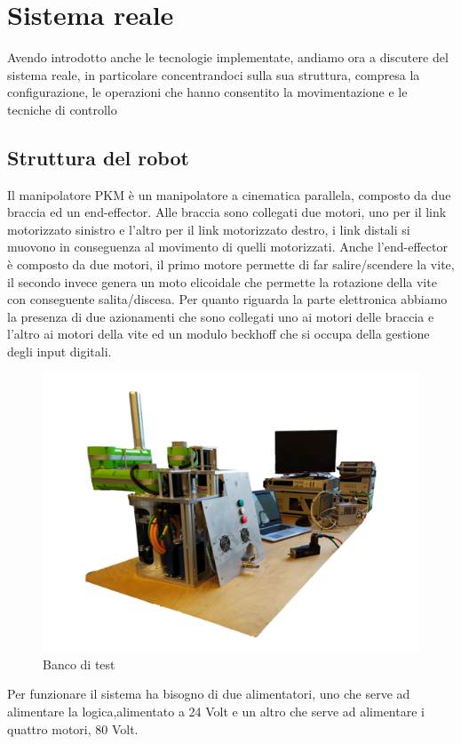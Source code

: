 

\section{Sistema reale}
Avendo introdotto anche le tecnologie implementate, andiamo ora a discutere del sistema reale, in particolare concentrandoci sulla sua struttura, compresa la configurazione, le operazioni che hanno consentito la movimentazione e le tecniche di controllo
\subsection{Struttura del robot}
Il manipolatore PKM è un manipolatore a cinematica parallela, composto da due braccia ed un end-effector. Alle braccia sono collegati due motori, uno per il link motorizzato sinistro e l'altro per il link motorizzato destro, i link distali si muovono in conseguenza al movimento di quelli motorizzati. Anche l'end-effector è composto da due motori, il primo motore permette di far salire/scendere la vite, il secondo invece genera un moto elicoidale che permette la rotazione della vite con conseguente salita/discesa. 
Per quanto riguarda la parte elettronica abbiamo la presenza di due azionamenti che sono collegati uno ai motori delle braccia e l'altro ai motori della vite ed un modulo beckhoff che si occupa della gestione degli input digitali.
\begin{figure}[ht]
	\begin{center}
		\includegraphics[scale=0.6]{Immagini/Sperimentale/banco}
		\caption{Banco di test}
		\label{fig:BancoProva}
	\end{center}
\end{figure}
Per funzionare il sistema ha bisogno di due alimentatori, uno che serve ad alimentare la logica,alimentato a 24 Volt e un altro che serve ad alimentare i quattro motori, 80 Volt.
